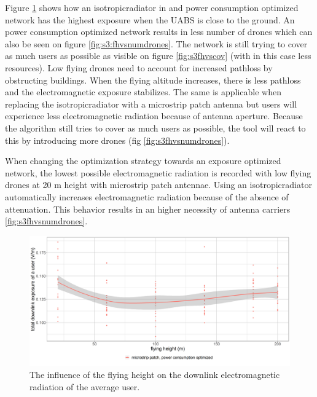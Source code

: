Figure \ref{fig:s3fhvsdl} shows how an \gls{isotropicradiator} in and power consumption optimized network has the highest exposure when 
the \gls{UABS}  is close to the ground. An power consumption optimized network results in less number of drones which can also be seen 
on figure \ref{fig:s3:fhvsnumdrones}. The network is still trying to cover as much users as possible as visible on figure 
\ref{fig:s3fhvscov} (with in this case less resources). Low flying drones need to account for increased pathloss by obstructing buildings.
When the flying altitude increases, there is less pathloss and the electromagnetic exposure stabilizes. The same is applicable when replacing
the \gls{isotropicradiator} with a microstrip patch antenna but users will experience less electromagnetic radiation 
because of antenna aperture. Because the algorithm still tries to cover as much users as possible, the tool will react to this by 
introducing more drones (fig \ref{fig:s3fhvsnumdrones}).

When changing the optimization strategy towards an exposure optimized network, the lowest possible electromagnetic radiation is recorded
with low flying drones at 20 m height with microstrip patch antennae. Using an \gls{isotropicradiator} automatically increases electromagnetic 
radiation because of the absence of attenuation. This behavior results in an higher necessity of antenna carriers \ref{fig:s3fhvsnumdrones}.


\begin{figure}[h!]
  \includegraphics[width=\textwidth]{../results/s3/fhvsdl.png}
  \caption{The influence of the flying height on the downlink electromagnetic radiation of the average user.}
  \label{fig:s3fhvsdl}
\end{figure}

